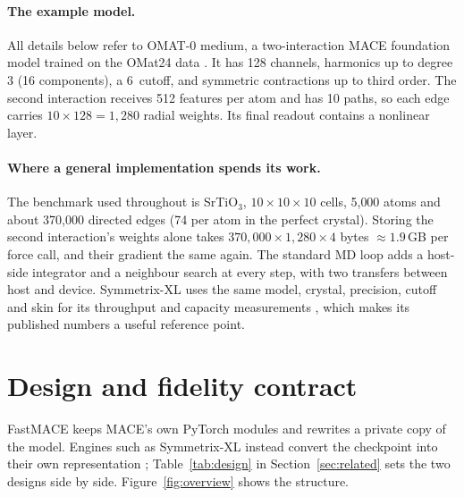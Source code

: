 \documentclass[11pt]{article}
\newcommand{\angstrom}{\text{\AA}}
\begin{document}
\paragraph{The example model.}
All details below refer to OMAT-0 medium, a two-interaction MACE foundation model
\cite{batatia2023foundation} trained on the OMat24 data \cite{barroso2024omat24}. It has 128 channels, harmonics
up to degree 3 (16 components), a 6\,\angstrom{} cutoff, and symmetric contractions up to third order. The second
interaction receives 512 features per atom and has 10 paths, so each edge carries $10\times128 = 1{,}280$ radial
weights. Its final readout contains a nonlinear layer.

\paragraph{Where a general implementation spends its work.}
The benchmark used throughout is SrTiO$_3$, $10\times10\times10$ cells, 5{,}000 atoms and about 370{,}000
directed edges (74 per atom in the perfect crystal). Storing the second interaction's weights alone takes
$370{,}000 \times 1{,}280 \times 4$ bytes $\approx 1.9$\,GB per force call, and their gradient the same again.
The standard MD loop adds a host-side integrator and a neighbour search at every step, with two transfers between
host and device. Symmetrix-XL uses the same model, crystal, precision, cutoff and skin for its throughput and
capacity measurements \cite{fu2026symmetrixxl}, which makes its published numbers a useful reference point.

\section{Design and fidelity contract}
\label{sec:design}

FastMACE keeps MACE's own PyTorch modules and rewrites a private copy of the model. Engines such as Symmetrix-XL
instead convert the checkpoint into their own representation \cite{fu2026symmetrixxl}; Table~\ref{tab:design} in
Section~\ref{sec:related} sets the two designs side by side. Figure~\ref{fig:overview} shows the structure.
\end{document}
